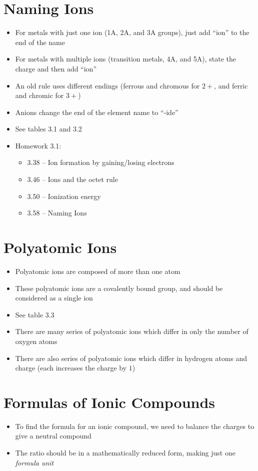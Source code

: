 \documentclass[12pt, openany, letterpaper]{memoir}
\begin{document}
\section{Naming Ions}
\begin{itemize}
	\item For metals with just one ion (1A, 2A, and 3A groups), just add ``ion'' to the end of the name
	\item For metals with multiple ions (transition metals, 4A, and 5A), state the charge and then add ``ion''
	\item An old rule uses different endings (ferrous and chromous for $2+$, and ferric and chromic for $3+$)
	\item Anions change the end of the element name to ``-ide''
	\item See tables 3.1 and 3.2
	\item Homework 3.1:
	      \begin{itemize}
		      \item 3.38 -- Ion formation by gaining/losing electrons
		      \item 3.46 -- Ions and the octet rule
		      \item 3.50 -- Ionization energy
		      \item 3.58 -- Naming Ions
	      \end{itemize}

\end{itemize}

\section{Polyatomic Ions}
\begin{itemize}
	\item Polyatomic ions are composed of more than one atom
	\item These polyatomic ions are a covalently bound group, and should be considered as a single ion
	\item See table 3.3
	\item There are many series of polyatomic ions which differ in only the number of oxygen atoms
	\item There are also series of polyatomic ions which differ in hydrogen atoms and charge (each  increases the charge by $1$)
\end{itemize}

\section{Formulas of Ionic Compounds}
\begin{itemize}
	\item To find the formula for an ionic compound, we need to balance the charges to give a neutral compound
	\item The ratio should be in a mathematically reduced form, making just one \emph{formula unit}
\end{itemize}
\end{document}
